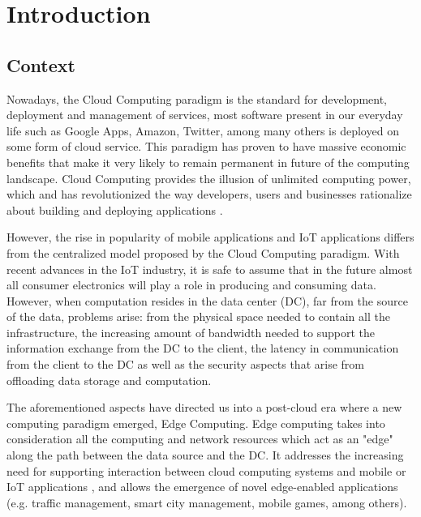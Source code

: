 \newcommand{\novathesis}{\emph{novathesis}}
\newcommand{\novathesisclass}{\texttt{novathesis.cls}}

\chapter{Introduction}
\label{cha:introduction}

\section{Context}

Nowadays, the Cloud Computing paradigm is the standard for development, deployment and management of services, most software present in our everyday life such as Google Apps, Amazon, Twitter, among many others is deployed on some form of cloud service. This paradigm has proven to have massive economic benefits that make it very likely to remain permanent in future of the computing landscape. Cloud Computing provides the illusion of unlimited computing power, which and has revolutionized the way developers, users and businesses rationalize about building and deploying applications \cite{10.1145/1721654.1721672}.

However, the rise in popularity of mobile applications and IoT applications differs from the centralized model proposed by the Cloud Computing paradigm. With recent advances in the IoT industry, it is safe to assume that in the future almost all consumer electronics will play a role in producing and consuming data. However, when computation resides in the data center (DC), far from the source of the data, problems arise: from the physical space needed to contain all the infrastructure, the increasing amount of bandwidth needed to support the information exchange from the DC to the client, the latency in communication from the client to the DC as well as the security aspects that arise from offloading data storage and computation.

The aforementioned aspects have directed us into a post-cloud era where a new computing paradigm emerged, Edge Computing. Edge computing takes into consideration all the computing and network resources which act as an "edge" along the path between the data source and the DC. It addresses the increasing need for supporting interaction between cloud computing systems and mobile or IoT applications \cite{iot_journal_shi_weisong_and_cao}, and allows the emergence of novel edge-enabled applications (e.g. traffic management, smart city management, mobile games, among others).


